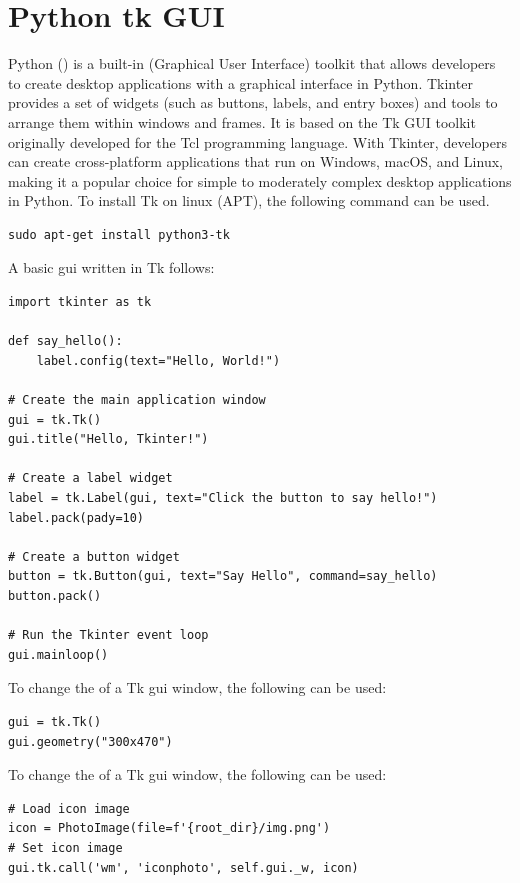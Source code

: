 \section{Python tk GUI}

Python  () is a built-in  (Graphical User Interface) toolkit that allows developers to create desktop applications with a graphical interface in Python. Tkinter provides a set of widgets (such as buttons, labels, and entry boxes) and tools to arrange them within windows and frames. It is based on the Tk GUI toolkit originally developed for the Tcl programming language. With Tkinter, developers can create cross-platform applications that run on Windows, macOS, and Linux, making it a popular choice for simple to moderately complex desktop applications in Python. To install Tk on linux (APT), the following command can be used.

\begin{lstlisting}[style=terminalstyle]
sudo apt-get install python3-tk
\end{lstlisting}

A basic  gui written in Tk follows:

\begin{lstlisting}
import tkinter as tk

def say_hello():
    label.config(text="Hello, World!")

# Create the main application window
gui = tk.Tk()
gui.title("Hello, Tkinter!")

# Create a label widget
label = tk.Label(gui, text="Click the button to say hello!")
label.pack(pady=10)

# Create a button widget
button = tk.Button(gui, text="Say Hello", command=say_hello)
button.pack()

# Run the Tkinter event loop
gui.mainloop()
\end{lstlisting}

To change the  of a Tk gui window, the following can be used:

\begin{lstlisting}
gui = tk.Tk()
gui.geometry("300x470")
\end{lstlisting}

To change the  of a Tk gui window, the following can be used:

\begin{lstlisting}
# Load icon image
icon = PhotoImage(file=f'{root_dir}/img.png')
# Set icon image
gui.tk.call('wm', 'iconphoto', self.gui._w, icon)
\end{lstlisting}



























